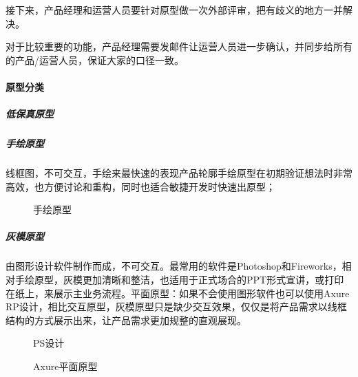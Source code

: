 \documentclass[letterpaper,11pt,english]{sphinxmanual}
\begin{document}
接下来，产品经理和运营人员要针对原型做一次外部评审，把有歧义的地方一并解决。

对于比较重要的功能，产品经理需要发邮件让运营人员进一步确认，并同步给所有的产品/运营人员，保证大家的口径一致。


\paragraph{原型分类}
\label{\detokenize{chapter_knowledge/prototype_design:id4}}

\subparagraph{低保真原型}
\label{\detokenize{chapter_knowledge/prototype_design:id5}}

\subparagraph{手绘原型}
\label{\detokenize{chapter_knowledge/prototype_design:id6}}
线框图，不可交互，手绘来最快速的表现产品轮廓手绘原型在初期验证想法时非常高效，也方便讨论和重构，同时也适合敏捷开发时快速出原型；

\begin{figure}[H]
\centering
\capstart

\noindent{}
\caption{手绘原型}\label{\detokenize{chapter_knowledge/prototype_design:id19}}\end{figure}


\subparagraph{灰模原型}
\label{\detokenize{chapter_knowledge/prototype_design:id7}}
由图形设计软件制作而成，不可交互。最常用的软件是Photoshop和Fireworks，相对手绘原型，灰模更加清晰和整洁，也适用于正式场合的PPT形式宣讲，或打印在纸上，来展示主业务流程。平面原型：如果不会使用图形软件也可以使用Axure
RP设计，相比交互原型，灰模原型只是缺少交互效果，仅仅是将产品需求以线框结构的方式展示出来，让产品需求更加规整的直观展现。%
\begin{footnote}[533]\sphinxAtStartFootnote
{}
%
\end{footnote}

\begin{figure}[H]
\centering
\capstart

\noindent{}
\caption{PS设计}\label{\detokenize{chapter_knowledge/prototype_design:id20}}\end{figure}

\begin{figure}[H]
\centering
\capstart

\noindent{}
\caption{Axure平面原型}\label{\detokenize{chapter_knowledge/prototype_design:id21}}\end{figure}
\end{document}
